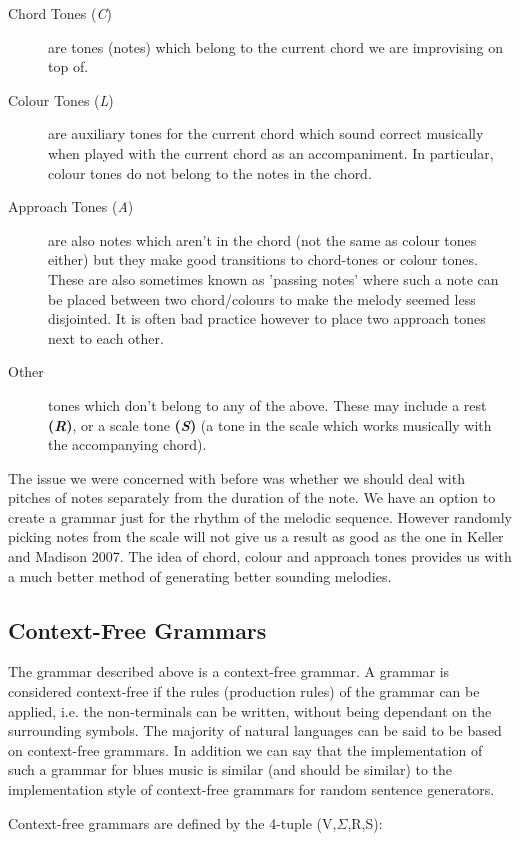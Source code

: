 \documentclass[pdftex,12pt,a4paper]{report}
\begin{document}
\begin{description}
  \item[Chord Tones (\textit{C})] are tones (notes) which belong to the current chord we are improvising on top of.
  \item[Colour Tones (\textit{L})] are auxiliary tones for the current chord which sound correct musically when played with the current chord as an accompaniment. In particular, colour tones do not belong to the notes in the chord. 
  \item[Approach Tones (\textit{A})] are also notes which aren't in the chord (not the same as colour tones either) but they make good transitions to chord-tones or colour tones. These are also sometimes known as 'passing notes' where such a note can be placed between two chord/colours to make the melody seemed less disjointed. It is often bad practice however to place two approach tones next to each other.
  \item[Other] tones which don't belong to any of the above. These may include a rest \textbf{(\textit{R})}, or a scale tone \textbf{(\textit{S})} (a tone in the scale which works musically with the accompanying chord).
\end{description}

The issue we were concerned with before was whether we should deal with pitches of notes separately from the duration of the note. We have an option to create a grammar just for the rhythm of the melodic sequence. However randomly picking notes from the scale will not give us a result as good as the one in Keller and Madison 2007. The idea of chord, colour and approach tones provides us with a much better method of generating better sounding melodies.

\subsection{Context-Free Grammars}
The grammar described above is a context-free grammar. A grammar is considered context-free if the rules (production rules) of the grammar can be applied, i.e. the non-terminals can be written, without being dependant on the surrounding symbols. The majority of natural languages can be said to be based on context-free grammars. In addition we can say that the implementation of such a grammar for blues music is similar (and should be similar) to the implementation style of context-free grammars for random sentence generators. 

Context-free grammars are defined by the 4-tuple (V,$\Sigma$,R,S):
\end{document}
